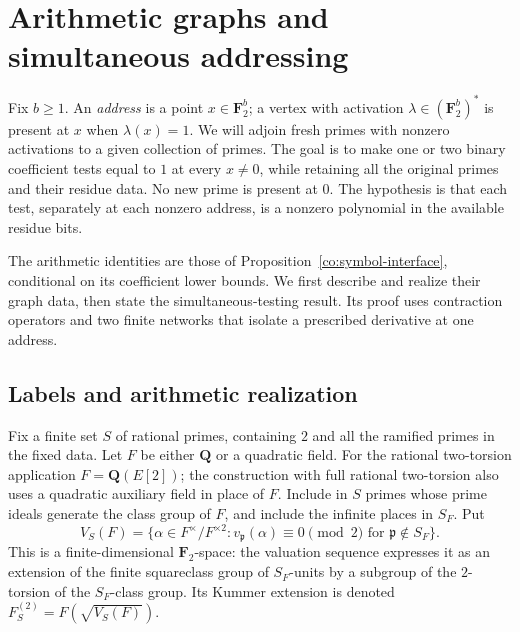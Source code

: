 \section{Arithmetic graphs and simultaneous addressing}\label{gr:section}

Fix $b\ge1$.  An \emph{address} is a point $x\in\mathbf F_2^b$;
a vertex with activation $\lambda\in(\mathbf F_2^b)^*$ is present at $x$
when $\lambda(x)=1$.  We will adjoin fresh primes with nonzero activations
to a given collection of primes.  The goal is to make one or two binary
coefficient tests equal to $1$ at every $x\ne0$, while retaining all the
original primes and their residue data.  No new prime is present at $0$.
The hypothesis is that each test, separately at each nonzero address,
is a nonzero polynomial in the available residue bits.

The arithmetic identities are those of
Proposition~\ref{co:symbol-interface}, conditional on its coefficient
lower bounds.  We first describe and realize their graph data, then state
the simultaneous-testing result.  Its proof uses contraction operators
and two finite networks that isolate a prescribed derivative at one address.

\subsection{Labels and arithmetic realization}

Fix a finite set $S$ of rational primes, containing $2$ and all the ramified
primes in the fixed data.  Let $F$ be either $\mathbf Q$ or a quadratic field.
For the rational two-torsion application $F=\mathbf Q(E[2])$; the construction
with full rational two-torsion also uses a quadratic auxiliary field in place
of $F$.  Include in $S$ primes whose prime ideals generate the class group of
$F$, and include the infinite places in $S_F$.  Put
\[
 V_S(F)=\{\alpha\in F^\times/F^{\times2}:
           v_{\mathfrak p}(\alpha)\equiv0\pmod2
           \text{ for }\mathfrak p\notin S_F\}.
\]
This is a finite-dimensional $\mathbf F_2$-space: the valuation sequence
expresses it as an extension of the finite squareclass group of $S_F$-units
by a subgroup of the $2$-torsion of the $S_F$-class group.  Its Kummer extension
is denoted $F_S^{(2)}=F(\sqrt{V_S(F)})$.

